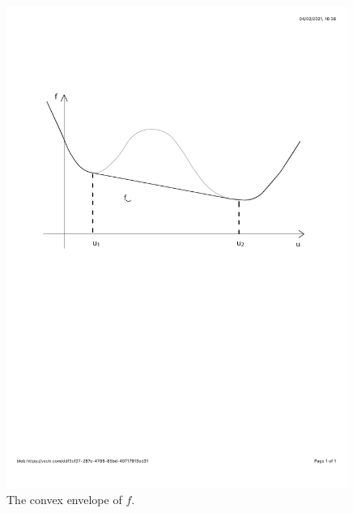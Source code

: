 \documentclass[10pt]{article}
\numberwithin{equation}{section}
\begin{document}
  \begin{minipage}{\linewidth}
  \centering
  \begin{minipage}{0.45\linewidth}
      \begin{figure}[H]
          \includegraphics[clip, trim=2cm 14cm 2cm 2cm, width=0.99\textwidth]{Figures/ConservationLaws/convex_envelope.pdf}
          \caption{The convex envelope of $f$.}
          \label{Fig:covexenvelope}
      \end{figure}
  \end{minipage}
  \hspace{0.05\linewidth}
  \begin{minipage}{0.45\linewidth}
      \begin{figure}[H]

\end{figure}
\end{minipage}
\end{minipage}
\end{document}
